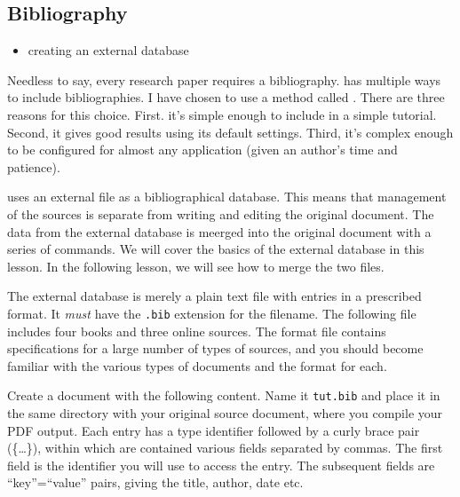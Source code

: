     \subsection{Bibliography}
    \label{Bibliography}

        \begin{framed}
            \begin{itemize}
                \item{creating an external \bib{} database}
            \end{itemize}
        \end{framed}

    Needless to say, every research paper requires a bibliography. \LaTeXe{} has multiple ways to include bibliographies. I have chosen to use a method called \bib{}. There are three reasons for this choice. First. it's simple enough to include in a simple tutorial. Second, it gives good results using its default settings. Third, it's complex enough to be configured for almost any application (given an author's time and patience).

    \bib{} uses an external file as a bibliographical database. This means that management of the sources is separate from writing and editing the original document. The data from the external database is meerged into the original document with a series of commands. We will cover the basics of the external database in this lesson. In the following lesson, we will see how to merge the two files.

    The external \bib{} database is merely a plain text file with entries in a prescribed format. It \textit{must} have the \texttt{.bib} extension for the filename. The following file includes four books and three online sources. The \bib format file contains specifications for a large number of types of sources, and you should become familiar with the various types of documents and the format for each.    

    Create a document with the following content. Name it \texttt{tut.bib} and place it in the same directory with your original source document, where you compile your PDF output. Each entry has a type identifier followed by a curly brace pair (\{\ldots{}\}), within which are contained various fields separated by commas. The first field is the identifier you will use to access the entry. The subsequent fields are ``key''=``value'' pairs, giving the title, author, date etc.
    

